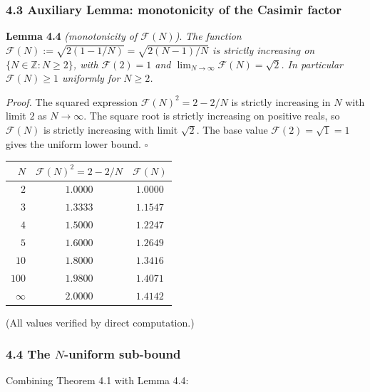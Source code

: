 \documentclass[
  11pt,
  a4paper,
]{amsart}
\begin{document}
\hypertarget{auxiliary-lemma-monotonicity-of-the-casimir-factor}{%
\subsubsection{4.3 Auxiliary Lemma: monotonicity of the Casimir factor}\label{auxiliary-lemma-monotonicity-of-the-casimir-factor}}

\textbf{Lemma 4.4} \emph{(monotonicity of \(\mathcal{F}(N)\))}. \emph{The function \(\mathcal{F}(N) := \sqrt{2(1 - 1/N)} = \sqrt{2(N-1)/N}\) is strictly increasing on \(\{N \in \mathbb{Z} : N \ge 2\}\), with \(\mathcal{F}(2) = 1\) and \(\lim_{N \to \infty} \mathcal{F}(N) = \sqrt{2}\). In particular \(\mathcal{F}(N) \ge 1\) uniformly for \(N \ge 2\).}

\emph{Proof.} The squared expression \(\mathcal{F}(N)^2 = 2 - 2/N\) is strictly increasing in \(N\) with limit \(2\) as \(N \to \infty\). The square root is strictly increasing on positive reals, so \(\mathcal{F}(N)\) is strictly increasing with limit \(\sqrt{2}\). The base value \(\mathcal{F}(2) = \sqrt{1} = 1\) gives the uniform lower bound. \(\square\)

\begin{longtable}[]{@{}rcc@{}}
\toprule\noalign{}
\(N\) & \(\mathcal{F}(N)^2 = 2 - 2/N\) & \(\mathcal{F}(N)\) \\
\midrule\noalign{}
\endhead
\bottomrule\noalign{}
\endlastfoot
\(2\) & \(1.0000\) & \(1.0000\) \\
\(3\) & \(1.3333\) & \(1.1547\) \\
\(4\) & \(1.5000\) & \(1.2247\) \\
\(5\) & \(1.6000\) & \(1.2649\) \\
\(10\) & \(1.8000\) & \(1.3416\) \\
\(100\) & \(1.9800\) & \(1.4071\) \\
\(\infty\) & \(2.0000\) & \(1.4142\) \\
\end{longtable}

(All values verified by direct computation.)

\hypertarget{the-n-uniform-sub-bound}{%
\subsubsection{\texorpdfstring{4.4 The \(N\)-uniform sub-bound}{4.4 The N-uniform sub-bound}}\label{the-n-uniform-sub-bound}}

Combining Theorem 4.1 with Lemma 4.4:
\end{document}
